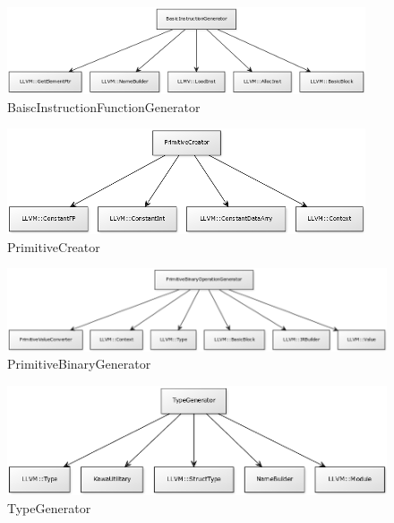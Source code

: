 \documentclass{article}
\begin{document}
\begin{figure}
 \begin{center}
 \includegraphics{img/basicInst.png} 
 \end{center}
 \caption{BaiscInstructionFunctionGenerator}
\end{figure}

\begin{figure}
 \begin{center}
 \includegraphics{img/primitive.png} 
 \end{center}
 \caption{PrimitiveCreator}
\end{figure}

\begin{figure}
 \begin{center}
 \includegraphics{img/primBin.png} 
 \end{center}
 \caption{PrimitiveBinaryGenerator}
\end{figure}

\begin{figure}
 \begin{center}
 \includegraphics{img/type.png} 
 \end{center}
 \caption{TypeGenerator}
\end{figure}
\end{document}
